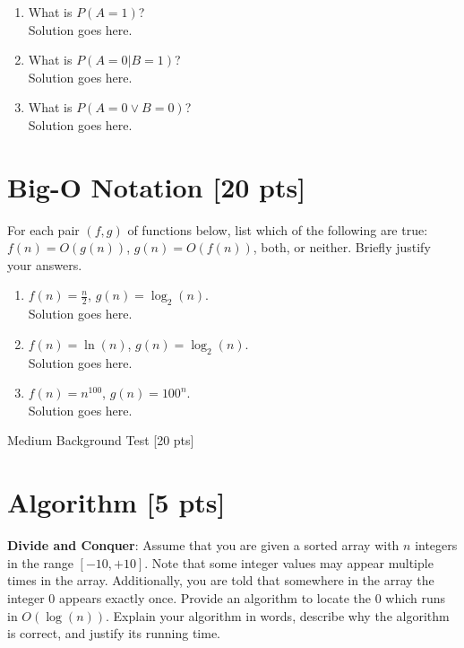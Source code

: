 \documentclass[a4paper]{article}
\theoremstyle{definition}
\newenvironment{soln}{
    \leavevmode\color{blue}\ignorespaces
}{}
\begin{document}
\begin{enumerate}
\begin{enumerate}
	    \begin{soln}  Solution goes here. \end{soln}
	\item 	What is $P(A = 1)$?\\
	    \begin{soln}  Solution goes here. \end{soln}
	\item 	What is $P(A = 0 | B = 1)$?\\
	    \begin{soln}  Solution goes here. \end{soln}
	\item 	What is $P(A = 0 \vee B = 0 )$?\\
	    \begin{soln}  Solution goes here. \end{soln}
\end{enumerate}
\end{enumerate}


\section{Big-O Notation [20 pts]}
For each pair $(f, g)$ of functions below, list which of the following
are true: $f(n) = O(g(n))$, $g(n) = O(f(n))$, both, or
neither. Briefly justify your answers.
\begin{enumerate}
	\item 	$f(n) = \frac{n}{2}$, $g(n) = \log_{2}(n)$.\\
	    \begin{soln}  Solution goes here. \end{soln}
	\item 	$f(n) = \ln(n)$, $g(n) = \log_{2}(n)$.\\
	    \begin{soln}  Solution goes here. \end{soln}
	\item 	$f(n) = n^{100}$, $g(n) = 100^n$.\\
	    \begin{soln}  Solution goes here. \end{soln}
\end{enumerate}


\clearpage  %


\begin{center}
\Huge
Medium Background Test [20 pts]
\end{center}

\section{Algorithm [5 pts]}
\textbf{Divide and Conquer}: Assume that you are given a sorted array
with $n$ integers in the range $[-10, +10]$. Note that some integer values
may appear multiple times in the array. Additionally, you are
told that somewhere in the array the integer $0$ appears exactly once. Provide an
algorithm to locate the $0$ which runs in $O(\log(n))$. Explain your
algorithm in words, describe why the algorithm is correct, and justify
its running time.\\
\end{document}
